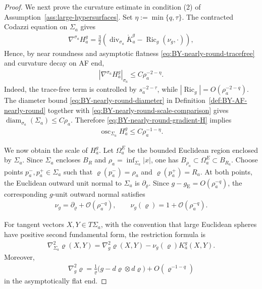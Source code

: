 \documentclass[10pt]{amsart}
\newcommand{\gE}{g_{\mathrm{E}}}
\newcommand{\Ric}{\operatorname{Ric}}
\theoremstyle{plain}
\theoremstyle{remark}
\begin{document}
\begin{proof}
		We next prove the curvature estimate in condition \textup{(2)} of Assumption~\ref{ass:large-hypersurfaces}. Set $\eta:=\min\{q,\tau\}$. The contracted Codazzi equation on $\Sigma_a$ gives
		\begin{align*}
			\nabla^{\sigma_a}H_a^g
			=
			\frac{3}{2}
			\left(
			\operatorname{div}_{\sigma_a}\mathring K_a^g
			-
			\Ric_g(\nu_g,\cdot)
			\right),
		\end{align*}
		Hence, by near roundness and asymptotic flatness \eqref{eq:BY-nearly-round-tracefree} and curvature decay on AF end,
		\begin{align}\label{eq:BY-nearly-round-gradient-H}
			\left|
			\nabla^{\sigma_a}H_a^g
			\right|_{\sigma_a}
			\leq
			C\rho_a^{-2-\eta}.
		\end{align}
		Indeed, the trace-free term is controlled by
		$s_a^{-2-\tau}$, while $|\Ric_g|=O(\rho_a^{-2-q})$. The diameter bound \eqref{eq:BY-nearly-round-diameter} in Definition~\ref{def:BY-AF-nearly-round}
		together with \eqref{eq:BY-nearly-round-scale-comparison} gives
		$\operatorname{diam}_{\sigma_a}(\Sigma_a)\leq C\rho_a$. Therefore
		\eqref{eq:BY-nearly-round-gradient-H} implies
		\begin{align}\label{eq:BY-nearly-round-H-oscillation}
			\operatorname{osc}_{\Sigma_a}H_a^g
			\leq
			C\rho_a^{-1-\eta}.
		\end{align}
		
		We now obtain the scale of $H_a^g$. Let $\Omega_a^E$ be the
		bounded Euclidean region enclosed by $\Sigma_a$. Since $\Sigma_a$
		encloses $B_R$ and $\rho_a=\inf_{\Sigma_a}|x|$, one has $B_{\rho_a}\subset\Omega_a^E\subset B_{R_a}$. Choose points $p_a^-,p_a^+\in\Sigma_a$ such that
		$\varrho(p_a^-)=\rho_a$ and $\varrho(p_a^+)=R_a$. At both points, the Euclidean outward unit normal to $\Sigma_a$ is
		$\partial_\varrho$. Since $g-\gE=O(\rho_a^{-q})$, the corresponding
		$g$-unit outward normal satisfies
		\begin{align*}
			\nu_g=\partial_\varrho+\mathcal O(\rho_a^{-q}),
			\qquad
			\nu_g(\varrho)=1+\mathcal O(\rho_a^{-q}).
		\end{align*}
		
		For tangent vectors $X,Y\in T\Sigma_a$, with the convention that
		large Euclidean spheres have positive second fundamental form, the restriction formula is
		\begin{align}\label{eq:BY-nearly-round-Hessian-restriction}
			\nabla_{\Sigma_a}^2\varrho(X,Y)
			= 
			\nabla_g^2\varrho(X,Y)
			-
			\nu_g(\varrho)K_a^g(X,Y).
		\end{align}
		Moreover,
		\begin{align}\label{eq:BY-nearly-round-radial-Hessian}
			\nabla_g^2\varrho
			=
			\frac1{\varrho}
			\bigl(g-d\varrho\otimes d\varrho\bigr)
			+
			O(\varrho^{-1-q})
		\end{align}
		in the asymptotically flat end.
		

\end{proof}
\end{document}
